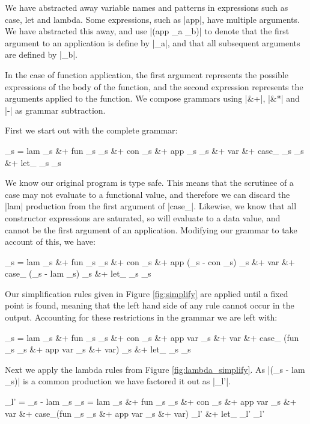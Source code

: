 \documentclass[preprint]{sigplanconf}
\begin{document}
We have abstracted away variable names and patterns in expressions such as case, let and lambda. Some expressions, such as |app|, have multiple arguments. We have abstracted this away, and use |(app _a _b)| to denote that the first argument to an application is define by |_a|, and that all subsequent arguments are defined by |_b|.

In the case of function application, the first argument represents the possible expressions of the body of the function, and the second expression represents the arguments applied to the function. We compose grammars using |&+|, |&*| and |-| as grammar subtraction.

First we start out with the complete grammar:

\begin{code}
_s  =  lam _s &+ fun _s _s &+ con _s &+ app _s _s &+ var &+
       case_ _s _s &+ let_ _s _s
\end{code}

We know our original program is type safe. This means that the scrutinee of a case may not evaluate to a functional value, and therefore we can discard the |lam| production from the first argument of |case_|. Likewise, we know that all constructor expressions are saturated, so will evaluate to a data value, and cannot be the first argument of an application. Modifying our grammar to take account of this, we have:

\begin{code}
_s  =  lam _s &+ fun _s _s &+ con _s &+ app (_s - con _s) _s &+ var &+
       case_ (_s - lam _s) _s &+ let_ _s _s
\end{code}

Our simplification rules given in Figure \ref{fig:simplify} are applied until a fixed point is found, meaning that the left hand side of any rule cannot occur in the output. Accounting for these restrictions in the grammar we are left with:

\begin{code}
_s  =  lam _s &+ fun _s _s &+ con _s &+ app var _s &+ var &+
       case_ (fun _s _s &+ app var _s &+ var) _s &+ let_ _s _s
\end{code}

Next we apply the lambda rules from Figure \ref{fig:lambda_simplify}. As |(_s - lam _s)| is a common production we have factored it out as |_l'|.

\begin{code}
_l'  =  _s - lam _s
_s   =  lam _s &+ fun _s _s &+ con _s &+ app var _s &+ var &+
        case_(fun _s _s &+ app var _s &+ var) _l' &+ let_ _l' _l'
\end{code}
\end{document}
